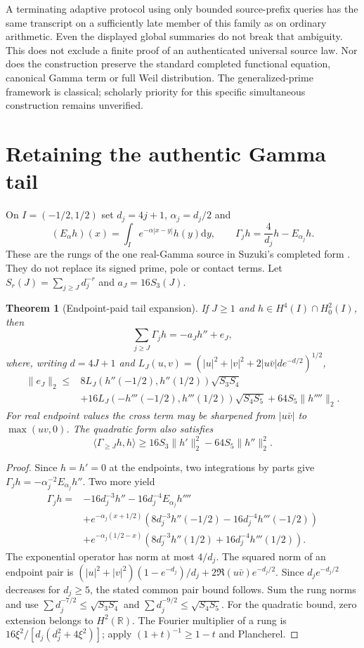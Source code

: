 \documentclass[11pt]{article}
\newtheorem{theorem}{Theorem}
\newcommand{\RR}{\mathbb R}
\newcommand{\dd}{\mathrm d}
\begin{document}
A terminating adaptive protocol using only bounded source-prefix queries has
the same transcript on a sufficiently late member of this family as on
ordinary arithmetic. Even the displayed global summaries do not break that
ambiguity. This does not exclude a finite proof of an authenticated universal
source law. Nor does the construction preserve the standard completed
functional equation, canonical Gamma term or full Weil distribution.
The generalized-prime framework is classical; scholarly priority for this
specific simultaneous construction remains unverified.

\section{Retaining the authentic Gamma tail}
On $I=(-1/2,1/2)$ set $d_j=4j+1$, $\alpha_j=d_j/2$ and
\[
(E_\alpha h)(x)=\int_Ie^{-\alpha|x-y|}h(y)\dd y,
\qquad \Gamma_jh=\frac4{d_j}h-E_{\alpha_j}h.
\]
These are the rungs of the one real-Gamma source in Suzuki's completed form
\cite{suzuki}. They do not replace its signed prime, pole or contact terms.
Let $S_r(J)=\sum_{j\ge J}d_j^{-r}$ and $a_J=16S_3(J)$.

\begin{theorem}[Endpoint-paid tail expansion]
If $J\ge1$ and $h\in H^4(I)\cap H^2_0(I)$, then
\[
\sum_{j\ge J}\Gamma_jh=-a_Jh''+e_J,
\]
where, writing $d=4J+1$ and
$L_J(u,v)=(|u|^2+|v|^2+2|u\bar v|d e^{-d/2})^{1/2}$,
\begin{align*}
\|e_J\|_2\le{}&8L_J(h''(-1/2),h''(1/2))\sqrt{S_3S_4}\\
&+16L_J(-h'''(-1/2),h'''(1/2))\sqrt{S_4S_5}
+64S_5\|h''''\|_2.
\end{align*}
For real endpoint values the cross term may be sharpened from $|u\bar v|$
to $\max(uv,0)$. The quadratic form also satisfies
\[
\langle\Gamma_{\ge J}h,h\rangle
\ge16S_3\|h'\|_2^2-64S_5\|h''\|_2^2.
\]
\end{theorem}
\begin{proof}
Since $h=h'=0$ at the endpoints, two integrations by parts give
$\Gamma_jh=-\alpha_j^{-2}E_{\alpha_j}h''$. Two more yield
\begin{align*}
\Gamma_jh={}&-16d_j^{-3}h''-16d_j^{-4}E_{\alpha_j}h''''\\
&+e^{-\alpha_j(x+1/2)}(8d_j^{-3}h''(-1/2)-16d_j^{-4}h'''(-1/2))\\
&+e^{-\alpha_j(1/2-x)}(8d_j^{-3}h''(1/2)+16d_j^{-4}h'''(1/2)).
\end{align*}
The exponential operator has norm at most $4/d_j$. The squared norm of an
endpoint pair is
$(|u|^2+|v|^2)(1-e^{-d_j})/d_j+2\Re(u\bar v)e^{-d_j/2}$.
Since $d_j e^{-d_j/2}$ decreases for $d_j\ge5$, the stated common pair bound
follows. Sum the rung norms and use
$\sum d_j^{-7/2}\le\sqrt{S_3S_4}$ and
$\sum d_j^{-9/2}\le\sqrt{S_4S_5}$.
For the quadratic bound, zero extension belongs to $H^2(\RR)$.
The Fourier multiplier of a rung is
$16\xi^2/[d_j(d_j^2+4\xi^2)]$; apply $(1+t)^{-1}\ge1-t$ and Plancherel.
\end{proof}
\end{document}
